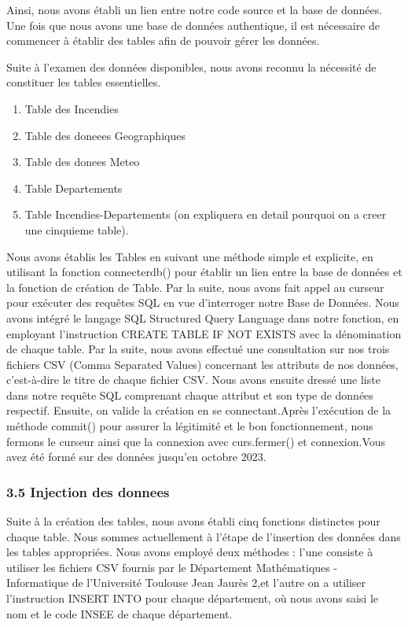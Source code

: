 \documentclass[
]{article}
\providecommand{\tightlist}{%
  \setlength{\itemsep}{0pt}\setlength{\parskip}{0pt}}
\begin{document}
Ainsi, nous avons établi un lien entre notre code source et la base de
données. Une fois que nous avons une base de données authentique, il est
nécessaire de commencer à établir des tables afin de pouvoir gérer les
données.

Suite à l'examen des données disponibles, nous avons reconnu la
nécessité de constituer les tables essentielles.

\begin{enumerate}
\def\labelenumi{\arabic{enumi}.}
\tightlist
\item
  Table des Incendies
\item
  Table des doneees Geographiques
\item
  Table des donees Meteo
\item
  Table Departements
\item
  Table Incendies-Departements (on expliquera en detail pourquoi on a
  creer une cinquieme table).
\end{enumerate}

Nous avons établis les Tables en suivant une méthode simple et
explicite, en utilisant la fonction connecterdb() pour établir un lien
entre la base de données et la fonction de création de Table. Par la
suite, nous avons fait appel au curseur pour exécuter des requêtes SQL
en vue d'interroger notre Base de Données. Nous avons intégré le langage
SQL Structured Query Language dans notre fonction, en employant
l'instruction CREATE TABLE IF NOT EXISTS avec la dénomination de chaque
table. Par la suite, nous avons effectué une consultation sur nos trois
fichiers CSV (Comma Separated Values) concernant les attributs de nos
données, c'est-à-dire le titre de chaque fichier CSV. Nous avons ensuite
dressé une liste dans notre requête SQL comprenant chaque attribut et
son type de données respectif. Ensuite, on valide la création en se
connectant.Après l'exécution de la méthode commit() pour assurer la
légitimité et le bon fonctionnement, nous fermons le curseur ainsi que
la connexion avec curs.fermer() et connexion.Vous avez été formé sur des
données jusqu'en octobre 2023.

\subsubsection{3.5 Injection des donnees}\label{injection-des-donnees}

Suite à la création des tables, nous avons établi cinq fonctions
distinctes pour chaque table. Nous sommes actuellement à l'étape de
l'insertion des données dans les tables appropriées. Nous avons employé
deux méthodes : l'une consiste à utiliser les fichiers CSV fournis par
le Département Mathématiques - Informatique de l'Université Toulouse
Jean Jaurès 2,et l'autre on a utiliser l'instruction INSERT INTO pour
chaque département, où nous avons saisi le nom et le code INSEE de
chaque département.
\end{document}
